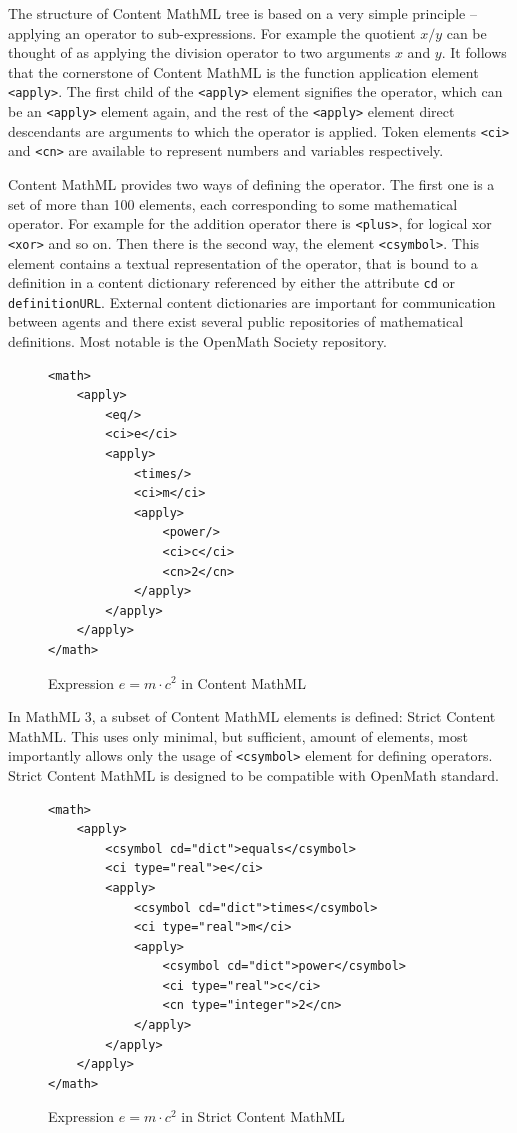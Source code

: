 \documentclass[11pt,oneside,final]{fithesis2}
\begin{document}
The structure of Content MathML tree is based on a very simple principle – applying an operator to sub-expressions. For example the quotient $x/y$ can be thought of as applying the division operator to two arguments $x$ and $y$. It follows that the cornerstone of Content MathML is the function application element \texttt{<apply>}.  The first child of the \texttt{<apply>} element signifies the operator, which can be an \texttt{<apply>} element again, and the rest of the \texttt{<apply>} element direct descendants are arguments to which the operator is applied. Token elements \texttt{<ci>} and \texttt{<cn>} are available to represent numbers and variables respectively. 

Content MathML provides two ways of defining the operator. The first one is a set of more than 100 elements, each corresponding to some mathematical operator. For example for the addition operator there is \texttt{<plus>}, for logical xor \texttt{<xor>} and so on. Then there is the second way, the element \texttt{<csymbol>}. This element contains a textual representation of the operator, that is bound to a definition in a content dictionary referenced by either the attribute \texttt{cd} or \texttt{definitionURL}. External content dictionaries are important for communication between agents and there exist several public repositories of mathematical definitions. Most notable is the OpenMath Society repository.

\begin{figure}[!ht]
\lstset{language=XML,frame=lines}
\begin{lstlisting}
<math>
	<apply>
		<eq/>
		<ci>e</ci>
		<apply>
			<times/>
			<ci>m</ci>
			<apply>
				<power/>
				<ci>c</ci>
				<cn>2</cn>
			</apply>
		</apply>
	</apply>
</math>
\end{lstlisting}
\caption{Expression $e=m \cdot c^2$ in Content MathML}
\end{figure}

In MathML 3, a subset of Content MathML elements is defined: Strict Content MathML. This uses only minimal, but sufficient, amount of elements, most importantly allows only the usage of \texttt{<csymbol>} element for defining operators. Strict Content MathML is designed to be compatible with OpenMath standard.

\begin{figure}[!ht]
\lstset{language=XML,frame=lines}
\begin{lstlisting}
<math>
	<apply>
		<csymbol cd="dict">equals</csymbol>
		<ci type="real">e</ci>
		<apply>
			<csymbol cd="dict">times</csymbol>
			<ci type="real">m</ci>
			<apply>
				<csymbol cd="dict">power</csymbol>
				<ci type="real">c</ci>
				<cn type="integer">2</cn>
			</apply>
		</apply>
	</apply>
</math>
\end{lstlisting}
\caption{Expression $e=m \cdot c^2$ in Strict Content MathML}
\end{figure}
\end{document}
